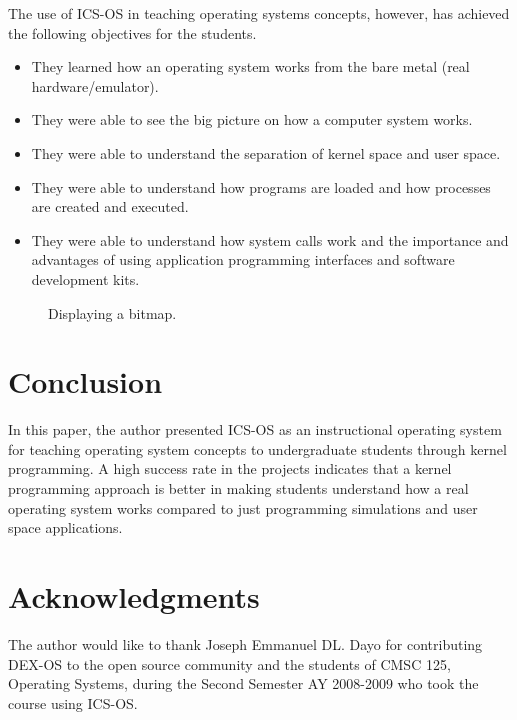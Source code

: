 \documentclass{acm_proc_article-sp}
\begin{document}
The use of ICS-OS in teaching operating systems concepts, however, has 
achieved the following objectives for the students.
\begin{itemize}
\item{They learned how an operating system works from the bare metal 
(real hardware/emulator).}
\item{They were able to see the big picture on how a computer system works.}
\item{They were able to understand the separation of kernel space and 
user space.}
\item{They were able to understand how programs are loaded and how processes 
are created and executed.}
\item{They were able to understand how system calls work and the importance
and advantages of using application programming interfaces and software 
development kits.}
\end{itemize}

\begin{figure}
\centering
{}
\caption{Displaying a bitmap.}
\end{figure}


\section{Conclusion}
In this paper, the author presented ICS-OS as an instructional operating 
system for teaching operating system concepts to undergraduate students 
through kernel programming. A high success rate in the projects
indicates that a kernel programming approach is better in making students
understand how a real operating system works compared to just programming 
simulations and user space applications.

\section{Acknowledgments}
The author would like to thank Joseph Emmanuel DL. Dayo for contributing 
DEX-OS to the open source community and the students of CMSC 125, Operating
Systems, during the Second Semester AY 2008-2009 who took the course 
using ICS-OS.




\balancecolumns
\end{document}
